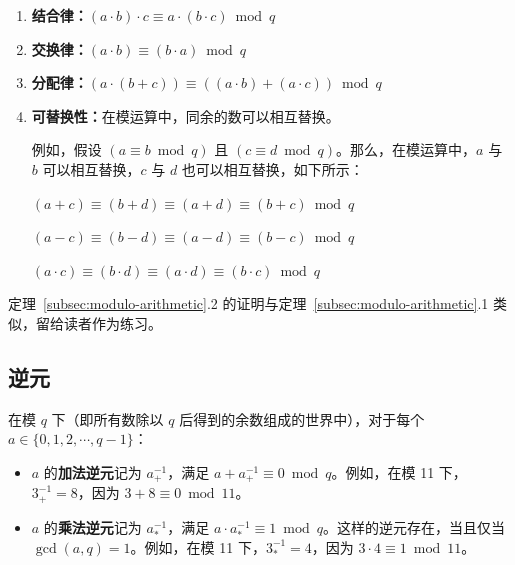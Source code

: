 \begin{tcolorbox}[title={\textbf{\tboxtheorem{\ref*{subsec:modulo-arithmetic}.2} 模运算的代数性质}}]

\begin{enumerate}
\item \textbf{结合律：}$(a \cdot b) \cdot c \equiv a \cdot (b \cdot c) \bmod q$

\item \textbf{交换律：}$(a \cdot b) \equiv (b \cdot a) \bmod q$

\item \textbf{分配律：}$(a \cdot (b + c)) \equiv ((a \cdot b) + (a \cdot c))  \bmod q$

\item \textbf{可替换性：}在模运算中，同余的数可以相互替换。

例如，假设 $(a \equiv b \bmod q)$ 且 $(c \equiv d \bmod q)$。那么，在模运算中，$a$ 与 $b$ 可以相互替换，$c$ 与 $d$ 也可以相互替换，如下所示：

$(a + c) \equiv (b + d) \equiv (a + d) \equiv (b + c) \bmod q$

$(a - c) \equiv (b - d) \equiv (a - d) \equiv (b - c) \bmod q$

$(a \cdot c) \equiv (b \cdot d) \equiv (a \cdot d) \equiv (b \cdot c) \bmod q$

\end{enumerate}

\end{tcolorbox}

定理~\ref*{subsec:modulo-arithmetic}.2 的证明与定理~\ref*{subsec:modulo-arithmetic}.1 类似，留给读者作为练习。


\subsection{逆元}
\label{subsec:modulo-inverse}

\begin{tcolorbox}[title={\textbf{\tboxdef{\ref*{subsec:modulo-inverse}} 模运算中的逆元}}]

在模 $q$ 下（即所有数除以 $q$ 后得到的余数组成的世界中），对于每个 $a \in \{0, 1, 2, \cdots, q-1\}$：

\begin{itemize}

\item $a$ 的\textbf{加法逆元}记为 $a_+^{-1}$，满足 $a + a_+^{-1} \equiv 0 \bmod q$。例如，在模 11 下，$3_+^{-1} = 8$，因为 $3 + 8 \equiv 0 \bmod 11$。

\item $a$ 的\textbf{乘法逆元}记为 $a_*^{-1}$，满足 $a \cdot a_*^{-1} \equiv 1 \bmod{q}$。这样的逆元存在，当且仅当 $\gcd(a,q)=1$。例如，在模 11 下，$3_*^{-1} = 4$，因为 $3 \cdot 4 \equiv 1 \bmod{11}$。

\end{itemize}

\end{tcolorbox}

